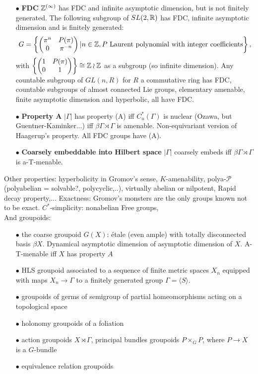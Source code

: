 \begin{itemize}
\item[$\bullet$] \textbf{FDC} $\mathbb Z^{(\infty)}$ has FDC and infinite asymptotic dimension, but is not finitely generated. The following subgroup of $SL(2,\mathbb R)$ has FDC, infinite asymptotic dimension and is finitely generated:  
\[G= \left\{\begin{pmatrix} \pi^n  & P(\pi) \\ 0 & \pi^{-n}\end{pmatrix} | n\in \mathbb Z, P \text{ Laurent polynomial with integer coefficients}\right\},\]
with $\left\{\begin{pmatrix} 1  & P(\pi) \\ 0 & 1\end{pmatrix} \right\} \cong \mathbb Z \wr \mathbb Z $ as a subgroup (so infinite dimension). Any countable subgroup of $GL(n,R)$ for $R$ a commutative ring has FDC, countable subgroups of almost connected Lie groups, elementary amenable, finite asymptotic dimension and hyperbolic, all have FDC.
\\

\item[$\bullet$] \textbf{Property A} $|\Gamma|$ has property (A) iff $C_u^*(\Gamma)$ is nuclear (Ozawa, but Guentner-Kaminker...) iff $\beta \Gamma \rtimes \Gamma$ is amenable. Non-equivariant version of Haagerup's property. All FDC groups have (A).\\
\item[$\bullet$] \textbf{Coarsely embeddable into Hilbert space} $|\Gamma|$ coarsely embeds iff $\beta \Gamma \rtimes \Gamma$ is a-T-menable.\\
\end{itemize}

Other properties: hyperbolicity in Gromov's sense, $K$-amenability, polya-$\mathcal P$ (polyabelian = solvable?, polycyclic,..), virtually abelian or nilpotent, Rapid decay property,... Exactness: Gromov's monsters are the only groups known not to be exact. $C^*$-simplicity: nonabelian Free groups, \\

And groupoids:
\begin{itemize}
\item[$\bullet$] the coarse groupoid $G(X)$: \'etale (even ample) with totally disconnected basis $\beta X$. Dynamical asymptotic dimension of asymptotic dimension of $X$. A-T-menable iff $X$ has property $A$
\item[$\bullet$] HLS groupoid associated to a sequence of finite metric spaces $X_n$ equipped with maps $X_n \rightarrow \Gamma$ to a finitely generated group $\Gamma = \langle S \rangle$. 
\item[$\bullet$] groupoids of germs of semigroup of partial homeomorphisms acting on a topological space
\item[$\bullet$] holonomy groupoids of a foliation
\item[$\bullet$] action groupoids $X\rtimes \Gamma$, principal bundles groupoids $P\times_G P$, where $P \rightarrow X$ is a $G$-bundle
\item[$\bullet$] equivalence relation groupoids
\end{itemize}

